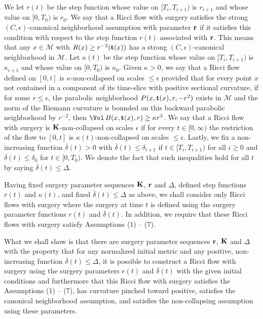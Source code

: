 We let $r(t)$ be the step function whose value on $[T_i,T_{i+1})$ is $r_{i+1}$
and whose value on $[0,T_0)$ is $r_0$. We say that a Ricci flow with surgery
satisfies the strong $(C,\epsilon)$-canonical neighborhood assumption with parameter ${\bf
r}$ if it satisfies this condition with respect to the step function $r(t)$
associated with ${\bf r}$. This means that any $x\in {\mathcal M}$ with
$R(x)\ge r^{-2}({\bf t}(x))$ has a strong $(C,\epsilon)$-canonical neighborhood in
${\mathcal M}$. Let $\kappa(t)$ be the step function whose value on
$[T_i,T_{i+1})$ is $\kappa_{i+1}$ and whose value on $[0,T_0)$ is $\kappa_0$.
Given $\kappa>0$, we say that a Ricci flow defined on $[0,t]$ is $\kappa$-non-collapsed
on scales $\le \epsilon$ provided that for every point $x$ not contained in a
component of its time-slice with positive sectional curvature,
if for some $r\le \epsilon$, the parabolic neighborhood $P(x,{\bf t}(x),r,-r^2)$ exists in ${\mathcal M}$
and the norm of the Riemann curvature is bounded on this backward
parabolic neighborhood by $r^{-2}$, then $\Vol\,B(x,{\bf t}(x),r)\ge
\kappa r^3$.
We say that a Ricci flow with surgery is ${\bf K}$-non-collapsed on scales
$\epsilon$ if for every $t\in [0,\infty)$ the restriction of the flow to
$[0,t]$ is $\kappa(t)$-non-collapsed on scales $\le \epsilon$.
  Lastly, we fix a non-increasing function $\overline\delta(t)>0$
with $\overline\delta(t)\le \delta_{i+1}$ if $t\in [T_i,T_{i+1})$ for all $i\ge
0$ and $\overline\delta(t)\le \delta_0$ for $t\in [0,T_0)$. We denote the fact
that such inequalities hold for all $t$ by saying $\overline\delta(t)\le
\Delta$.


Having fixed surgery parameter sequences ${\bf K}$, ${\bf r}$ and
$\Delta$, defined step functions $r(t)$ and $\kappa(t)$, and fixed
$\overline\delta(t)\le \Delta$ as above, we shall consider only
Ricci flows with surgery  where the surgery at time $t$ is defined
using the surgery parameter functions $r(t)$ and
$\overline\delta(t)$. In addition,  we require that these Ricci
flows with surgery satisfy Assumptions (1) -- (7).

What we shall  show is that there are surgery parameter
sequences ${\bf r}$, ${\bf K}$ and $\Delta$ with the property that
for any normalized initial metric and any positive,
non-increasing function $\overline\delta(t)\le \Delta$, it is
possible to construct a Ricci flow with surgery using the surgery
parameters $r(t)$ and $\overline\delta(t)$ with the given initial
conditions and furthermore that this Ricci flow with surgery
satisfies the Assumptions (1) -- (7), has curvature pinched toward
positive, satisfies the canonical neighborhood assumption, and satisfies the
non-collapsing assumption using these parameters.

